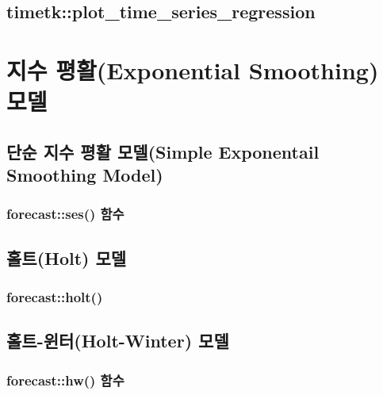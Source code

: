 \documentclass[
]{book}
\begin{document}
\hypertarget{timetkplot_time_series_regression}{%
\subsection{timetk::plot\_time\_series\_regression}\label{timetkplot_time_series_regression}}

\hypertarget{uxc9c0uxc218-uxd3c9uxd65cexponential-smoothing-uxbaa8uxb378}{%
\section{지수 평활(Exponential Smoothing) 모델}\label{uxc9c0uxc218-uxd3c9uxd65cexponential-smoothing-uxbaa8uxb378}}

\hypertarget{uxb2e8uxc21c-uxc9c0uxc218-uxd3c9uxd65c-uxbaa8uxb378simple-exponentail-smoothing-model}{%
\subsection{단순 지수 평활 모델(Simple Exponentail Smoothing Model)}\label{uxb2e8uxc21c-uxc9c0uxc218-uxd3c9uxd65c-uxbaa8uxb378simple-exponentail-smoothing-model}}

\hypertarget{forecastses-uxd568uxc218}{%
\subsubsection{forecast::ses() 함수}\label{forecastses-uxd568uxc218}}

\hypertarget{uxd640uxd2b8holt-uxbaa8uxb378}{%
\subsection{홀트(Holt) 모델}\label{uxd640uxd2b8holt-uxbaa8uxb378}}

\hypertarget{forecastholt}{%
\subsubsection{forecast::holt()}\label{forecastholt}}

\hypertarget{uxd640uxd2b8-uxc708uxd130holt-winter-uxbaa8uxb378}{%
\subsection{홀트-윈터(Holt-Winter) 모델}\label{uxd640uxd2b8-uxc708uxd130holt-winter-uxbaa8uxb378}}

\hypertarget{forecasthw-uxd568uxc218}{%
\subsubsection{forecast::hw() 함수}\label{forecasthw-uxd568uxc218}}
\end{document}
